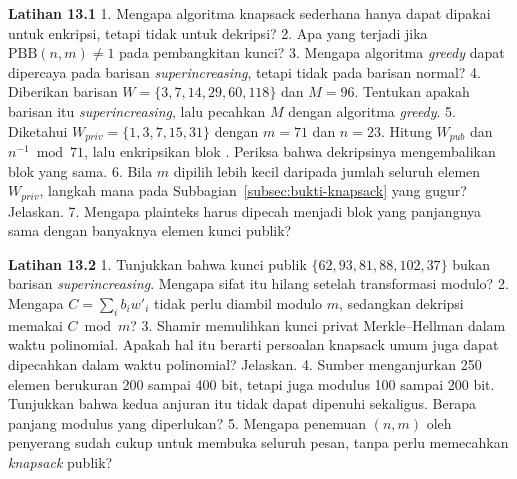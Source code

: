 
\begin{obereflection}
\textbf{Latihan 13.1}
1. Mengapa algoritma knapsack sederhana hanya dapat dipakai untuk enkripsi,
   tetapi tidak untuk dekripsi?
2. Apa yang terjadi jika $\text{PBB}(n, m) \neq 1$ pada pembangkitan kunci?
3. Mengapa algoritma \textit{greedy} dapat dipercaya pada barisan
   \textit{superincreasing}, tetapi tidak pada barisan normal?
4. Diberikan barisan $W = \{3, 7, 14, 29, 60, 118\}$ dan $M = 96$. Tentukan
   apakah barisan itu \textit{superincreasing}, lalu pecahkan $M$ dengan
   algoritma \textit{greedy}.
5. Diketahui $W_{priv} = \{1, 3, 7, 15, 31\}$ dengan $m = 71$ dan $n = 23$.
   Hitung $W_{pub}$ dan $n^{-1} \bmod 71$, lalu enkripsikan blok
   . Periksa bahwa dekripsinya mengembalikan blok yang sama.
6. Bila $m$ dipilih lebih kecil daripada jumlah seluruh elemen $W_{priv}$,
   langkah mana pada Subbagian~\ref{subsec:bukti-knapsack} yang gugur? Jelaskan.
7. Mengapa plainteks harus dipecah menjadi blok yang panjangnya sama dengan
   banyaknya elemen kunci publik?
\end{obereflection}

\begin{obereflection}
\textbf{Latihan 13.2}
1. Tunjukkan bahwa kunci publik $\{62, 93, 81, 88, 102, 37\}$ bukan barisan
   \textit{superincreasing}. Mengapa sifat itu hilang setelah transformasi
   modulo?
2. Mengapa $C = \sum_i b_i w'_i$ tidak perlu diambil modulo $m$, sedangkan
   dekripsi memakai $C \bmod m$?
3. Shamir memulihkan kunci privat Merkle--Hellman dalam waktu polinomial.
   Apakah hal itu berarti persoalan knapsack umum juga dapat dipecahkan dalam
   waktu polinomial? Jelaskan.
4. Sumber menganjurkan 250 elemen berukuran 200 sampai 400 bit, tetapi juga
   modulus 100 sampai 200 bit. Tunjukkan bahwa kedua anjuran itu tidak dapat
   dipenuhi sekaligus. Berapa panjang modulus yang diperlukan?
5. Mengapa penemuan $(n, m)$ oleh penyerang sudah cukup untuk membuka seluruh
   pesan, tanpa perlu memecahkan \textit{knapsack} publik?
\end{obereflection}
